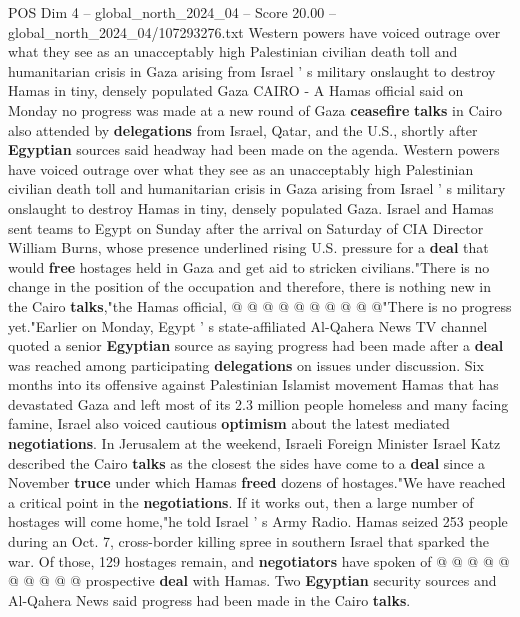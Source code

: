 \begin{textsample}{POS Dim 4 – global\_north\_2024\_04 – Score 20.00 – global\_north\_2024\_04/107293276.txt}  \label{ex:f4_pos_364}
Western powers have voiced outrage over what they see as an unacceptably high Palestinian civilian death toll and humanitarian crisis in Gaza arising from Israel ' s military onslaught to destroy Hamas in tiny, densely populated Gaza CAIRO - A Hamas official said on Monday no progress was made at a new round of Gaza \textbf{ceasefire} \textbf{talks} in Cairo also attended by \textbf{delegations} from Israel, Qatar, and the U.S., shortly after \textbf{Egyptian} sources said headway had been made on the agenda.
Western powers have voiced outrage over what they see as an unacceptably high Palestinian civilian death toll and humanitarian crisis in Gaza arising from Israel ' s military onslaught to destroy Hamas in tiny, densely populated Gaza.
Israel and Hamas sent teams to Egypt on Sunday after the arrival on Saturday of CIA Director William Burns, whose presence underlined rising U.S. pressure for a \textbf{deal} that would \textbf{free} hostages held in Gaza and get aid to stricken civilians."There is no change in the position of the occupation and therefore, there is nothing new in the Cairo \textbf{talks},"the Hamas official, @ @ @ @ @ @ @ @ @ @"There is no progress yet."Earlier on Monday, Egypt ' s state-affiliated Al-Qahera News TV channel quoted a senior \textbf{Egyptian} source as saying progress had been made after a \textbf{deal} was reached among participating \textbf{delegations} on issues under discussion.
Six months into its offensive against Palestinian Islamist movement Hamas that has devastated Gaza and left most of its 2.3 million people homeless and many facing famine, Israel also voiced cautious \textbf{optimism} about the latest mediated \textbf{negotiations}.
In Jerusalem at the weekend, Israeli Foreign Minister Israel Katz described the Cairo \textbf{talks} as the closest the sides have come to a \textbf{deal} since a November \textbf{truce} under which Hamas \textbf{freed} dozens of hostages."We have reached a critical point in the \textbf{negotiations}.
If it works out, then a large number of hostages will come home,"he told Israel ' s Army Radio.
Hamas seized 253 people during an Oct. 7, cross-border killing spree in southern Israel that sparked the war.
Of those, 129 hostages remain, and \textbf{negotiators} have spoken of @ @ @ @ @ @ @ @ @ @ prospective \textbf{deal} with Hamas.
Two \textbf{Egyptian} security sources and Al-Qahera News said progress had been made in the Cairo \textbf{talks}.

\end{textsample}
